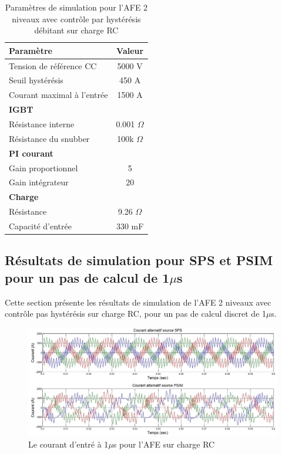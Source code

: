\begin{table}[htb]
\centering
\begin{tabular}{|l|c|} 
  \hline
  \textbf{Paramètre} & \textbf{Valeur}  \\
  \hline\hline
  Tension de référence CC & 5000 V\\ \hline
  Seuil hystérésis & 450 A\\ \hline
  Courant maximal à l'entrée& 1500 A \\ \hline \hline
  \multicolumn{2}{|l|}{\textbf{IGBT}}\\ \hline
  Résistance interne & 0.001 $\Omega$\\
  Résistance du snubber & 100k $\Omega$\\ \hline \hline
   \multicolumn{2}{|l|}{\textbf{PI courant}}\\ \hline
  Gain proportionnel & 5 \\
  Gain intégrateur & 20 \\ \hline \hline
  \multicolumn{2}{|l|}{\textbf{Charge}}\\ \hline
  Résistance & 9.26 $\Omega$ \\
  Capacité d'entrée & 330 mF\\
  \hline
\end{tabular}
\caption{Paramètres de simulation pour l'AFE 2 niveaux avec contrôle par hystérésis débitant sur charge RC}
\label{p_AF_RC}
\end{table}

\clearpage

\subsection{Résultats de simulation pour SPS et PSIM pour un pas de calcul de 1$\mu$s}
Cette section présente les résultats de simulation de l'AFE 2 niveaux avec contrôle pas hystérésis sur charge RC, pour un pas de calcul discret de 1$\mu$s. 




\begin{figure}[htb]
\centering
\includegraphics[scale=0.5]{fig/AFERC/cour_al.jpg}
\caption{Le courant d'entré à 1$\mu$s pour l'AFE sur charge RC}
\label{AF_RC_cou}
\end{figure}




